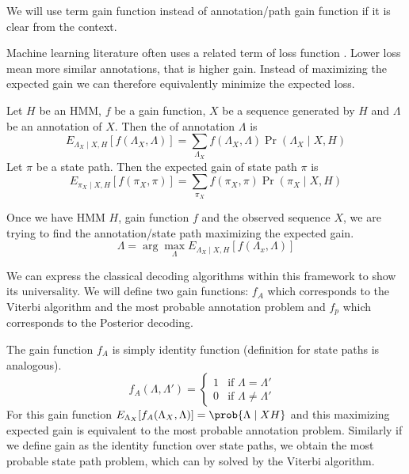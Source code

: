 \begin{note}
We will use term gain function instead of annotation/path gain function if it is
clear from the context.

Machine learning literature often uses a related term of loss function
\cite{Lember2010}. Lower loss mean more similar annotations, that is higher gain. Instead
of maximizing the expected gain we can therefore equivalently minimize the expected
loss.
\end{note}

\begin{definition}
Let $H$ be an HMM, $f$ be a gain function, $X$ be a sequence generated by $H$ and
$\Lambda$ be an annotation of $X$. Then the  of annotation
$\Lambda$ is 
\begin{equation}
E_{\Lambda_X\mid X,H}[f(\Lambda_X,\Lambda)] =
\sum_{\Lambda_X}f(\Lambda_X,\Lambda)\Pr\left(\Lambda_X\mid X,H\right)
\end{equation}
Let $\pi$ be a state path. Then the expected gain of state path $\pi$ is 
\begin{equation}
E_{\pi_X\mid X,H}[f(\pi_X,\pi)] =
\sum_{\pi_X}f(\pi_X,\pi)\Pr\left(\pi_X\mid X,H\right)
\end{equation}
\end{definition}


Once we have HMM $H$, gain function $f$ and the observed sequence $X$,
we are trying to find the annotation/state path maximizing the expected gain. 
\begin{equation}
\Lambda = \arg\max_{\Lambda}E_{\Lambda_X\mid
X,H}\left[f\left(\Lambda_x,\Lambda\right)\right]
\end{equation}

We can express the classical decoding algorithms within this framework to show
its universality. We will define two gain functions: $f_A$ which corresponds to
the  
Viterbi algorithm and the most probable annotation problem and $f_p$ which
corresponds to 
the Posterior decoding.

The gain function $f_A$ is simply identity function (definition for state paths
is analogous).
\begin{equation}
f_A(\Lambda,\Lambda') = \begin{cases}
1 & \text{if $\Lambda = \Lambda'$ }\\
0 & \text{if $\Lambda \not=\Lambda'$}
\end{cases}
\end{equation}
For this gain function $E_{\Lambda_X}[f_A(\Lambda_X,\Lambda)]=\prob{\Lambda\mid
X H}$ and this
maximizing expected gain is 
equivalent to the most probable annotation problem. Similarly if we define gain
as the identity function over state paths, we obtain the most probable state
path problem, which can by solved by the Viterbi algorithm.

